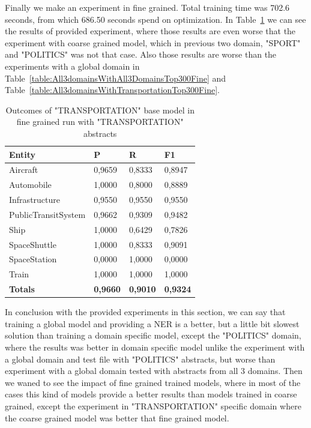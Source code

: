 \documentclass[thesis=M,english]{FITthesis}[2018/05/30]
\begin{document}
	Finally we make an experiment in fine grained. Total training time was 702.6 seconds, from which 686.50 seconds spend on optimization. In Table~\ref{table:TransportationDomainsWithTransportationTop300Fine} we can see the results of provided experiment, where those results are even worse that the experiment with coarse grained model, which in previous two domain, "SPORT" and "POLITICS" was not that case. Also those results are worse than the experiments with a global domain in Table~\ref{table:All3domainsWithAll3DomainsTop300Fine} and Table~\ref{table:All3domainsWithTransportationTop300Fine}. 
	\begin{table}[H]\centering
		\begin{tabular}{|l|l|l|l|}
			\hline {\textbf{Entity}} & {\textbf{P}} & {\textbf{R}} & {\textbf{F1}}\\\hline
				Aircraft & 0,9659 & 0,8333 & 0,8947\\
				Automobile & 1,0000 & 0,8000 & 0,8889\\				
				Infrastructure & 0,9550 & 0,9550 & 0,9550\\
				PublicTransitSystem & 0,9662 & 0,9309 & 0,9482\\
				Ship & 1,0000 & 0,6429 & 0,7826\\				
				SpaceShuttle & 1,0000 & 0,8333 & 0,9091\\
				SpaceStation & 0,0000 & 1,0000 & 0,0000\\
				Train & 1,0000 & 1,0000 & 1,0000\\\hline
				\textbf{Totals} & \textbf{0,9660} & \textbf{0,9010} & \textbf{0,9324}\\\hline
		\end{tabular}
		\caption{Outcomes of "TRANSPORTATION" base model in fine grained run with "TRANSPORTATION" abstracts \label{table:TransportationDomainsWithTransportationTop300Fine}}
	\end{table}	

	In conclusion with the provided experiments in this section, we can say that training a global model and providing a NER is a better, but a little bit slowest solution than training a domain specific model, except the "POLITICS" domain, where the results was better in domain specific model unlike the experiment with a global domain and test file with "POLITICS" abstracts, but worse than experiment with a global domain tested with abstracts from all 3 domains. Then we waned to see the impact of fine grained trained models, where in most of the cases this kind of models provide a better results than models trained in coarse grained, except the experiment in "TRANSPORTATION" specific domain where the coarse grained model was better that fine grained model.
	
\end{document}
